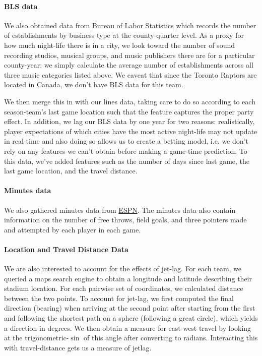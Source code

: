 \documentclass[letterpaper,12pt]{article}
\begin{document}
\paragraph{BLS data} We also obtained data from
\href{https://www.bls.gov/data/}{Bureau of Labor Statistics} which records the number of establishments by business type at the county-quarter level. As a 
proxy for how much night-life there is in a city, we look toward the 
number of sound recording studios, musical groups, and music publishers there 
are for a particular county-year: we simply calculate the average number of establishments across all three music categories listed above. We caveat that since the Toronto Raptors are located in Canada, we don't have BLS data for this team.

We then merge this in with our lines data, taking care to do so according to each season-team's last game location such that the feature captures the proper
party effect. In addition, we lag our BLS data by one year for two reasons:
realistically, player expectations of which cities have the most active night-life may not
update in real-time and also doing so allows us to create a betting model, i.e.
we don't rely on any features we can't obtain before making a game-time prediction. 
To this data, we've added features such as 
the number of days since last game, the last game location, and the travel distance. 

\paragraph{Minutes data}
We also gathered minutes data from \href{http://www.espn.com/nba/scoreboard/_/date/}{ESPN}.
The minutes data also contain information on the number of free throws, field goals, and three pointers made and attempted by each player in each game.

\paragraph{Location and Travel Distance Data} We are also interested
to account for the effects of jet-lag. For each team, we queried
a maps search engine to obtain a longitude and latitude describing their
stadium location.\cite{ggmap}
For each pairwise set of coordinates, we calculated distance between the two
points.\cite{sp} To account for jet-lag, we first computed the final direction 
(bearing) when arriving at the 
second point after starting from the first and following the shortest path on a sphere 
(following a great circle), which yields a direction in degrees. 
We then obtain a measure for east-west travel by looking at the trigonometric-$\sin$ of this angle after converting to radians.
Interacting this with travel-distance gets us a measure of jetlag.\cite{lallensack}
\end{document}

